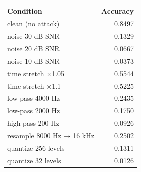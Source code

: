 \begin{tabular}{lr}
\toprule
Condition & Accuracy \\
\midrule
clean (no attack) & 0.8497 \\
noise 30 dB SNR & 0.1329 \\
noise 20 dB SNR & 0.0667 \\
noise 10 dB SNR & 0.0373 \\
time stretch ×1.05 & 0.5544 \\
time stretch ×1.1 & 0.5225 \\
low-pass 4000 Hz & 0.2435 \\
low-pass 2000 Hz & 0.1750 \\
high-pass 200 Hz & 0.0926 \\
resample 8000 Hz → 16 kHz & 0.2502 \\
quantize 256 levels & 0.1311 \\
quantize 32 levels & 0.0126 \\
\bottomrule
\end{tabular}
